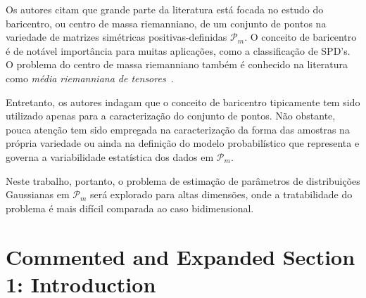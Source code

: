 \documentclass[a4paper,titlepage]{article}
\begin{document}
Os autores citam que grande parte da literatura está focada no estudo do
baricentro, ou centro de massa riemanniano, de um conjunto de pontos na
variedade de matrizes simétricas positivas-definidas $\mathcal{P}_m$.  O
conceito de baricentro é de notável importância para muitas aplicações, como a
classificação de SPD's. O problema do centro de massa riemanniano também é
conhecido na literatura como \textit{média riemanniana de
tensores}~\cite{moakher2005differential}.

Entretanto, os autores indagam que o conceito de baricentro tipicamente tem
sido utilizado apenas para a caracterização do conjunto de pontos. Não
obstante, pouca atenção tem sido empregada na caracterização da forma das
amostras na própria variedade ou ainda na definição do modelo probabilístico
que representa e governa a variabilidade estatística dos dados em
$\mathcal{P}_m$.

Neste trabalho, portanto, o problema de estimação de parâmetros de
distribuições Gaussianas em $\mathcal{P}_m$ será explorado para altas
dimensões, onde a tratabilidade do problema é mais difícil comparada ao caso
bidimensional.

\section{Commented and Expanded Section 1: Introduction}

\begin{center}
  \vspace{1em}
  \vspace{1em}
\end{center}
\end{document}

